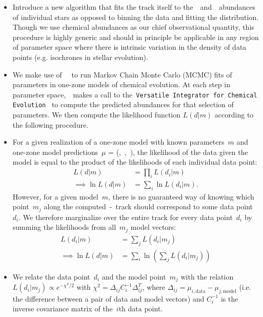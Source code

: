 \documentclass[ms.tex]{subfiles}
\begin{document}
\begin{itemize}

	\item Introduce a new algorithm that fits the track itself to
	the~\feh~and~\afe~abundances of individual stars as opposed to binning the
	data and fitting the distribution.
	Though we use chemical abundances as our chief observational quantity, this
	procedure is highly generic and should in principle be applicable in any
	region of parameter space where there is intrinsic variation in the density
	of data points (e.g. isochrones in stellar evolution).

	\item We make use of~\mc~\cite{Foreman-Mackey2013} to run Markov Chain
	Monte Carlo (MCMC) fits of parameters in one-zone models of chemical
	evolution.
	At each step in parameter space,~\mc~makes a call to the~\texttt{Versatile
	Integrator for Chemical Evolution}~\citep[\vice;][]{Johnson2020,
	Griffith2021, Johnson2021} to compute the predicted abundances for that
	selection of parameters.
	We then compute the likelihood function $L(d|m)$ according to the following
	procedure.

	\item For a given realization of a one-zone model with known parameters~$m$
	and one-zone model predictions~$\mu$ = (\feh,~\afe,~\logage), the
	likelihood of the data given the model is equal to the product of the
	likelihoods of each individual data point:
	\begin{subequations}\begin{align}
	L(d|m) &= \prod_i L(d_i|m)
	\\
	\implies \ln L(d|m) &= \sum_i \ln L(d_i|m).
	\end{align}\end{subequations}
	However, for a given model~$m$, there is no guaranteed way of knowing
	which point~$m_j$ along the computed~\afe-\feh~track should correspond to
	some data point~$d_i$.
	We therefore marginalize over the entire track for every data point~$d_i$
	by summing the likelihoods from all~$m_j$ model vectors:
	\begin{subequations}\begin{align}
	L(d_i|m) &= \sum_j L(d_i|m_j)
	\\
	\implies \ln L(d|m) &= \sum_i \ln \left(\sum_j L(d_i|m_j)\right)
	\end{align}\end{subequations}

	\item We relate the data point~$d_i$ and the model point~$m_j$ with the
	relation~$L(d_i|m_j) \propto e^{-\chi^2/2}$ with
	$\chi^2 = \Delta_{ij}C_i^{-1}\Delta_{ij}^T$, where
	$\Delta_{ij} = \mu_{i,\text{data}} - \mu_{j,\text{model}}$ (i.e. the
	difference between a pair of data and model vectors) and $C_i^{-1}$ is the
	inverse covariance matrix of the~$i$th data point.


\end{itemize}
\end{document}
